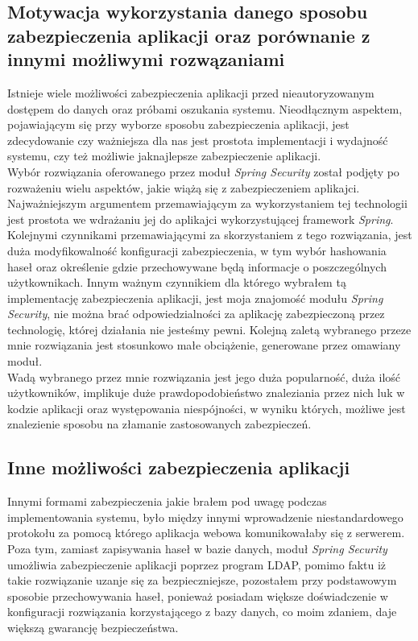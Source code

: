 \documentclass[a4paper, titlepage]{article}
\begin{document}
\subsection{Motywacja wykorzystania danego sposobu zabezpieczenia aplikacji oraz porównanie z innymi możliwymi rozwązaniami}
		Istnieje wiele możliwości zabezpieczenia aplikacji przed nieautoryzowanym dostępem do danych oraz próbami oszukania systemu. Nieodłącznym aspektem, pojawiającym się przy wyborze sposobu zabezpieczenia aplikacji, jest zdecydowanie czy ważniejsza dla nas jest prostota implementacji i wydajność systemu, czy też możliwie jaknajlepsze zabezpieczenie aplikacji.
		\\Wybór rozwiązania oferowanego przez moduł \textit{Spring Security} został podjęty po rozważeniu wielu aspektów, jakie wiążą się z zabezpieczeniem aplikajci. Najważniejszym argumentem przemawiającym za wykorzystaniem tej technologii jest prostota we wdrażaniu jej do aplikajci wykorzystującej framework \textit{Spring}. Kolejnymi czynnikami przemawiającymi za skorzystaniem z tego rozwiązania, jest duża modyfikowalność konfiguracji zabezpieczenia, w tym wybór hashowania haseł oraz określenie gdzie przechowywane będą informacje o poszczególnych użytkownikach. Innym ważnym czynnikiem dla którego wybrałem tą implementację zabezpieczenia aplikacji, jest moja znajomość modułu \textit{Spring Security}, nie można brać odpowiedzialności za aplikację zabezpieczoną przez technologię, której działania nie jesteśmy pewni. Kolejną zaletą wybranego przeze mnie rozwiązania jest stosunkowo małe obciążenie, generowane przez omawiany moduł. 
		\\Wadą wybranego przez mnie rozwiązania jest jego duża popularność, duża ilość użytkowników, implikuje duże prawdopodobieństwo znaleziania przez nich luk w kodzie aplikacji oraz występowania niespójności, w wyniku których, możliwe jest znalezienie sposobu na złamanie zastosowanych zabezpieczeń. 
				
\subsection{Inne możliwości zabezpieczenia aplikacji}
                Innymi formami zabezpieczenia jakie brałem pod uwagę podczas implementowania systemu, było między innymi wprowadzenie niestandardowego protokołu za pomocą którego aplikacja webowa komunikowałaby się z serwerem. 
                Poza tym, zamiast zapisywania haseł w bazie danych, moduł \textit{Spring Security} umożliwia zabezpieczenie aplikacji poprzez program LDAP, pomimo faktu iż takie rozwiązanie uzanje się za bezpieczniejsze, pozostałem przy podstawowym sposobie przechowywania haseł, ponieważ posiadam większe doświadczenie w konfiguracji rozwiązania korzystającego z bazy danych, co moim zdaniem, daje większą gwarancję bezpieczeństwa.
\end{document}
